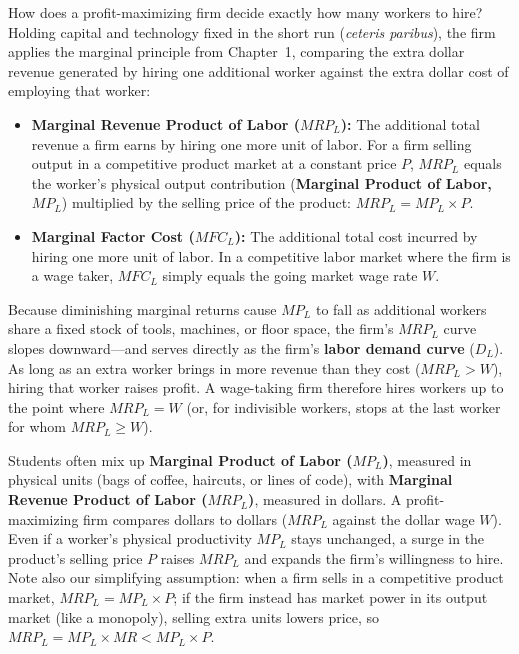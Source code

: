 \documentclass[11pt,letterpaper]{article}
\begin{document}
How does a profit-maximizing firm decide exactly how many workers to hire? Holding capital and technology fixed in the short run (\emph{ceteris paribus}), the firm applies the marginal principle from Chapter~1, comparing the extra dollar revenue generated by hiring one additional worker against the extra dollar cost of employing that worker:
\begin{itemize}
    \item \textbf{Marginal Revenue Product of Labor ($MRP_L$):} The additional total revenue a firm earns by hiring one more unit of labor. For a firm selling output in a competitive product market at a constant price $P$, $MRP_L$ equals the worker's physical output contribution (\textbf{Marginal Product of Labor, $MP_L$}) multiplied by the selling price of the product: $MRP_L = MP_L \times P$.
    \item \textbf{Marginal Factor Cost ($MFC_L$):} The additional total cost incurred by hiring one more unit of labor. In a competitive labor market where the firm is a wage taker, $MFC_L$ simply equals the going market wage rate $W$.
\end{itemize}

Because diminishing marginal returns cause $MP_L$ to fall as additional workers share a fixed stock of tools, machines, or floor space, the firm's $MRP_L$ curve slopes downward---and serves directly as the firm's \textbf{labor demand curve} ($D_L$). As long as an extra worker brings in more revenue than they cost ($MRP_L > W$), hiring that worker raises profit. A wage-taking firm therefore hires workers up to the point where $MRP_L = W$ (or, for indivisible workers, stops at the last worker for whom $MRP_L \ge W$).

\begin{tcolorbox}[colback=CourseAmber!12!white,colframe=CourseOrange!85!black,title=\textbf{Clear It Up: Physical Productivity ($MP_L$) Is Not Marginal Revenue Product ($MRP_L$)}]
Students often mix up \textbf{Marginal Product of Labor ($MP_L$)}, measured in physical units (bags of coffee, haircuts, or lines of code), with \textbf{Marginal Revenue Product of Labor ($MRP_L$)}, measured in dollars. A profit-maximizing firm compares dollars to dollars ($MRP_L$ against the dollar wage $W$). Even if a worker's physical productivity $MP_L$ stays unchanged, a surge in the product's selling price $P$ raises $MRP_L$ and expands the firm's willingness to hire. Note also our simplifying assumption: when a firm sells in a competitive product market, $MRP_L = MP_L \times P$; if the firm instead has market power in its output market (like a monopoly), selling extra units lowers price, so $MRP_L = MP_L \times MR < MP_L \times P$.
\end{tcolorbox}
\end{document}
